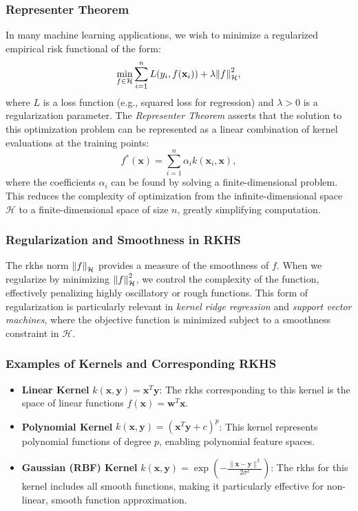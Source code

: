 \subsubsection{Representer Theorem}

In many machine learning applications, we wish to minimize a regularized empirical risk functional of the form:
\[
\min_{f \in \mathcal{H}} \sum_{i=1}^n L(y_i, f(\mathbf{x}_i)) + \lambda \norm{f}_{\mathcal{H}}^2,
\]
where $L$ is a loss function (e.g., squared loss for regression) and $\lambda > 0$ is a regularization parameter. The \textit{Representer Theorem} asserts that the solution to this optimization problem can be represented as a linear combination of kernel evaluations at the training points:
\[
f^*(\mathbf{x}) = \sum_{i=1}^n \alpha_i k(\mathbf{x}_i, \mathbf{x}),
\]
where the coefficients $\alpha_i$ can be found by solving a finite-dimensional problem. This reduces the complexity of optimization from the infinite-dimensional space $\mathcal{H}$ to a finite-dimensional space of size $n$, greatly simplifying computation.

\subsubsection{Regularization and Smoothness in RKHS}

The \ac{rkhs} norm $\norm{f}_{\mathcal{H}}$ provides a measure of the smoothness of $f$. When we regularize by minimizing $\norm{f}_{\mathcal{H}}^2$, we control the complexity of the function, effectively penalizing highly oscillatory or rough functions. This form of regularization is particularly relevant in \textit{kernel ridge regression} and \textit{support vector machines}, where the objective function is minimized subject to a smoothness constraint in $\mathcal{H}$.

\subsubsection{Examples of Kernels and Corresponding RKHS}

\begin{itemize}
    \item \textbf{Linear Kernel} $k(\mathbf{x}, \mathbf{y}) = \mathbf{x}^T \mathbf{y}$: The \ac{rkhs} corresponding to this kernel is the space of linear functions $f(\mathbf{x}) = \mathbf{w}^T \mathbf{x}$.
    \item \textbf{Polynomial Kernel} $k(\mathbf{x}, \mathbf{y}) = (\mathbf{x}^T \mathbf{y} + c)^p$: This kernel represents polynomial functions of degree $p$, enabling polynomial feature spaces.
    \item \textbf{Gaussian (RBF) Kernel} $k(\mathbf{x}, \mathbf{y}) = \exp\left(-\frac{\|\mathbf{x} - \mathbf{y}\|^2}{2\sigma^2}\right)$: The \ac{rkhs} for this kernel includes all smooth functions, making it particularly effective for non-linear, smooth function approximation.
\end{itemize}


